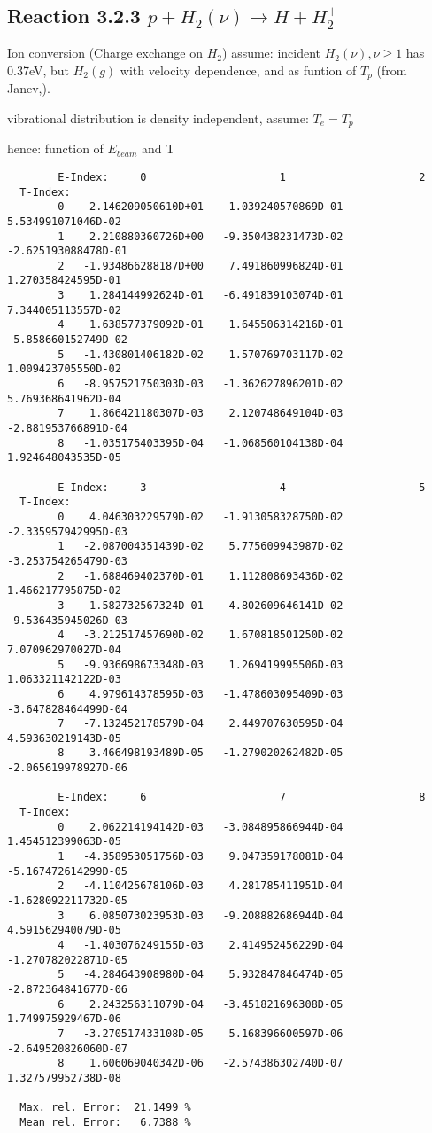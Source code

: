 \subsection{
Reaction 3.2.3  $  p + H_2(\nu) \rightarrow H + H_2^+  $
}
  Ion conversion (Charge exchange on $H_2$)
  assume: incident $H_2(\nu), \nu \ge 1 $ has 0.37eV, but $H_2(g)$
  with velocity dependence, and as funtion of $T_p$ (from
  Janev,\cite{kn:Janev}).

  vibrational distribution is density independent, assume: $T_e = T_p$

  hence: function of $E_{beam}$ and T
\begin{verbatim}
        E-Index:     0                     1                     2
  T-Index:
        0   -2.146209050610D+01   -1.039240570869D-01    5.534991071046D-02
        1    2.210880360726D+00   -9.350438231473D-02   -2.625193088478D-01
        2   -1.934866288187D+00    7.491860996824D-01    1.270358424595D-01
        3    1.284144992624D-01   -6.491839103074D-01    7.344005113557D-02
        4    1.638577379092D-01    1.645506314216D-01   -5.858660152749D-02
        5   -1.430801406182D-02    1.570769703117D-02    1.009423705550D-02
        6   -8.957521750303D-03   -1.362627896201D-02    5.769368641962D-04
        7    1.866421180307D-03    2.120748649104D-03   -2.881953766891D-04
        8   -1.035175403395D-04   -1.068560104138D-04    1.924648043535D-05

        E-Index:     3                     4                     5
  T-Index:
        0    4.046303229579D-02   -1.913058328750D-02   -2.335957942995D-03
        1   -2.087004351439D-02    5.775609943987D-02   -3.253754265479D-03
        2   -1.688469402370D-01    1.112808693436D-02    1.466217795875D-02
        3    1.582732567324D-01   -4.802609646141D-02   -9.536435945026D-03
        4   -3.212517457690D-02    1.670818501250D-02    7.070962970027D-04
        5   -9.936698673348D-03    1.269419995506D-03    1.063321142122D-03
        6    4.979614378595D-03   -1.478603095409D-03   -3.647828464499D-04
        7   -7.132452178579D-04    2.449707630595D-04    4.593630219143D-05
        8    3.466498193489D-05   -1.279020262482D-05   -2.065619978927D-06

        E-Index:     6                     7                     8
  T-Index:
        0    2.062214194142D-03   -3.084895866944D-04    1.454512399063D-05
        1   -4.358953051756D-03    9.047359178081D-04   -5.167472614299D-05
        2   -4.110425678106D-03    4.281785411951D-04   -1.628092211732D-05
        3    6.085073023953D-03   -9.208882686944D-04    4.591562940079D-05
        4   -1.403076249155D-03    2.414952456229D-04   -1.270782022871D-05
        5   -4.284643908980D-04    5.932847846474D-05   -2.872364841677D-06
        6    2.243256311079D-04   -3.451821696308D-05    1.749975929467D-06
        7   -3.270517433108D-05    5.168396600597D-06   -2.649520826060D-07
        8    1.606069040342D-06   -2.574386302740D-07    1.327579952738D-08

  Max. rel. Error:  21.1499 %
  Mean rel. Error:   6.7388 %
\end{verbatim}
